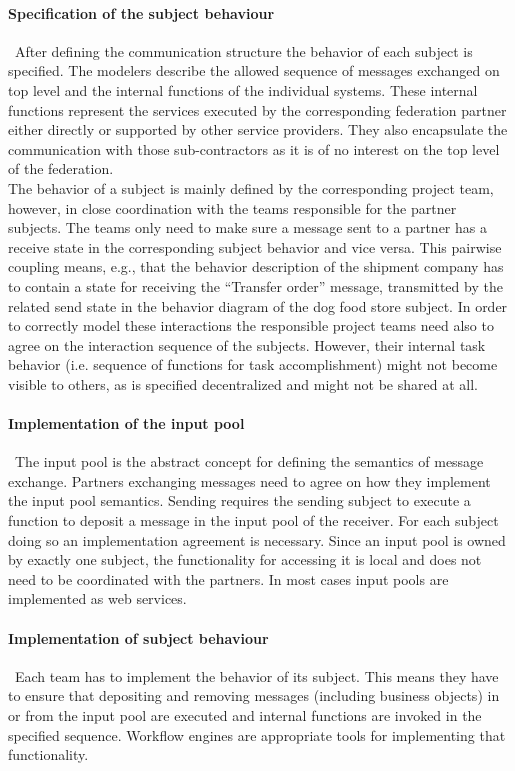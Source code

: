 \paragraph{Specification of the subject behaviour}\
After defining the communication structure the behavior of each subject is specified. The modelers describe the allowed sequence of messages exchanged on top level and the internal functions of the individual systems. These internal functions represent the services executed by the corresponding federation partner either directly or supported by other service providers. They also encapsulate the communication with those sub-contractors as it is of no interest on the top level of the federation.\\
The behavior of a subject is mainly defined by the corresponding project team, however, in close coordination with the teams responsible for the partner subjects. The teams only need to make sure a message sent to a partner has a receive state in the corresponding subject behavior and vice versa. This pairwise coupling means, e.g., that the behavior description of the shipment company has to contain a state for receiving the “Transfer order” message, transmitted by the related send state in the behavior diagram of the dog food store subject. In order to correctly model these interactions the responsible project teams need also to agree on the interaction sequence of the subjects. However, their internal task behavior (i.e. sequence of functions for task accomplishment) might not become visible to others, as is specified decentralized and might not be shared at all. 

\paragraph{Implementation of the input pool}\
The input pool is the abstract concept for defining the semantics of message exchange. Partners exchanging messages need to agree on how they implement the input pool semantics. Sending requires the sending subject to execute a function to deposit a message in the input pool of the receiver. For each subject doing so an implementation agreement is necessary. Since an input pool is owned by exactly one subject, the functionality for accessing it is local and does not need to be coordinated with the partners. In most cases input pools are implemented as web services.

\paragraph{Implementation of subject behaviour}\
Each team has to implement the behavior of its subject. This means they have to ensure that depositing and removing messages (including business objects) in or from the input pool are executed and internal functions are invoked in the specified sequence. Workflow engines are appropriate tools for implementing that functionality.\


